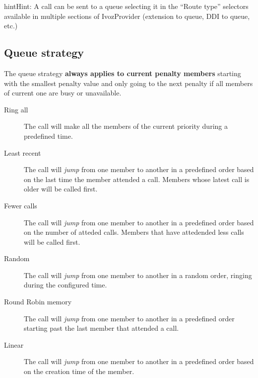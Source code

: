 \documentclass[letterpaper,10pt,english]{sphinxmanual}
\begin{document}
\begin{notice}{hint}{Hint:}
A call can be sent to a queue selecting it in the ``Route type'' selectors
available in multiple sections of IvozProvider (extension to queue, DDI
to queue, etc.)
\end{notice}


\subsection{Queue strategy}
\label{pbx_features/queues:queue-strategy}
The queue strategy \textbf{always applies to current penalty members} starting with
the smallest penalty value and only going to the next penalty if all members of
current one are busy or unavailable.
\begin{description}
\item[{Ring all}] \leavevmode{}\label{pbx_features/queues:term-ring-all}
The call will make all the members of the current priority during a
predefined time.

\item[{Least recent}] \leavevmode{}\label{pbx_features/queues:term-least-recent}
The call will \emph{jump} from one member to another in a predefined order
based on the last time the member attended a call. Members whose latest
call is older will be called first.

\item[{Fewer calls}] \leavevmode{}\label{pbx_features/queues:term-fewer-calls}
The call will \emph{jump} from one member to another in a predefined order
based on the number of atteded calls. Members that have attedended less
calls will be called first.

\item[{Random}] \leavevmode{}\label{pbx_features/queues:term-random}
The call will \emph{jump} from one member to another in a random order,
ringing during the configured time.

\item[{Round Robin memory}] \leavevmode{}\label{pbx_features/queues:term-round-robin-memory}
The call will \emph{jump} from one member to another in a predefined order
starting past the last member that attended a call.

\item[{Linear}] \leavevmode{}\label{pbx_features/queues:term-linear}
The call will \emph{jump} from one member to another in a predefined order
based on the creation time of the member.

\end{description}
\end{document}
